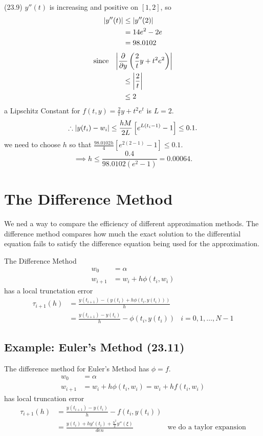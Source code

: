 \soln (23.9) $y''(t)$ is increasing and positive on $[1,2]$, so
\begin{align*}
  \abs{y''(t)} &\leq \abs{y''(2)} \\
  &= 14e^2 - 2e \\
  &= 98.0102 \\
\end{align*}
\begin{align*}
  \text{since}\quad & \abs{\frac{\partial}{\partial y} \left(\frac{2}{t}y +
  t^2e^2\right)} \\
                &\quad\leq \abs{\frac{2}{t}} \\
                &\quad\leq 2 \\
\end{align*}
a Lipschitz Constant for $f(t,y) = \frac{2}{t}y+t^2e^t$ is $L = 2$.
\[
\therefore \abs{y(t_i) - w_i} \leq \frac{hM}{2L}\left[e^{L(t_i-1)}-1\right] \leq
0.1
.\]
we need to choose $h$ so that $\displaystyle \frac{98.0102h}{4}
\left[e^{2(2-1)}-1 \right] \leq 0.1$.
\[
\implies h \leq \frac{0.4}{98.0102(e^2-1)} = 0.00064
.\]

\section{The Difference Method}
We ned a way to compare the efficiency of different approximation methods. The
difference method compares how much the exact solution to the differential
equation fails to satisfy the difference equation being used for the approximation.

 The Difference Method
\begin{align*}
  w_0 &= \alpha \\
  w_{i+1} &= w_i + h \phi (t_i, w_i)
\end{align*}
has a local trunctation error 
\begin{align*}
  \tau_{i+1}(h) &= \frac{y(t_{i+1}) - (y(t_i) + h \phi (t_i, y(t_i)))}{h} \\
                &= \frac{y(t_{i+1}) - y(t_i)}{h} - \phi(t_i, y(t_i)) 
                & i = 0, 1, \dots, N-1
\end{align*}

\subsection{Example: Euler's Method (23.11)}
The difference method for Euler's Method has $\phi = f$.
\begin{align*}
  w_0 &= \alpha \\
  w_{i+1} &= w_i + h \phi(t_i, w_i) = w_i + h f(t_i, w_i)
\end{align*}
has local truncation error
\begin{align*}
  \tau_{i+1}(h) &= \frac{y(t_{i+1}) - y(t_i)}{h} - f(t_i, y(t_i)) \\
                &= \frac{y(t_i) + hy'(t_i) + \frac{h^2}{2}y''(\xi)}{den} & \text{we do a taylor expansion} \\
\end{align*}

